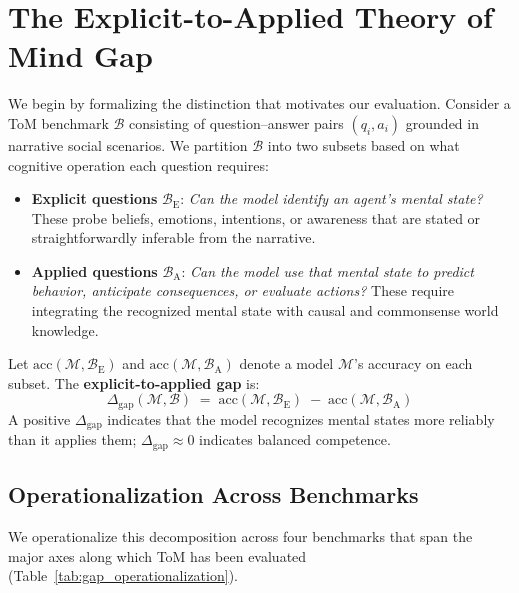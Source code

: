 \documentclass{article}
\begin{document}
\section{The Explicit-to-Applied Theory of Mind Gap}
\label{sec:gap}

We begin by formalizing the distinction that motivates our evaluation.
Consider a ToM benchmark $\mathcal{B}$ consisting of question--answer pairs $(q_i, a_i)$ grounded in narrative social scenarios.
We partition $\mathcal{B}$ into two subsets based on what cognitive operation each question requires:
%
\begin{itemize}[leftmargin=*,itemsep=1pt,topsep=3pt]
    \item \textbf{Explicit questions} $\mathcal{B}_\mathrm{E}$: \emph{Can the model identify an agent's mental state?}
    These probe beliefs, emotions, intentions, or awareness that are stated or straightforwardly inferable from the narrative.
    \item \textbf{Applied questions} $\mathcal{B}_\mathrm{A}$: \emph{Can the model use that mental state to predict behavior, anticipate consequences, or evaluate actions?}
    These require integrating the recognized mental state with causal and commonsense world knowledge.
\end{itemize}
%
Let $\mathrm{acc}(\mathcal{M}, \mathcal{B}_\mathrm{E})$ and $\mathrm{acc}(\mathcal{M}, \mathcal{B}_\mathrm{A})$ denote a model $\mathcal{M}$'s accuracy on each subset.
The \textbf{explicit-to-applied gap} is:
%
\begin{equation}
    \Delta_\mathrm{gap}(\mathcal{M}, \mathcal{B}) \;=\; \mathrm{acc}(\mathcal{M}, \mathcal{B}_\mathrm{E}) \;-\; \mathrm{acc}(\mathcal{M}, \mathcal{B}_\mathrm{A})
    \label{eq:gap}
\end{equation}
%
A positive $\Delta_\mathrm{gap}$ indicates that the model recognizes mental states more reliably than it applies them; $\Delta_\mathrm{gap} \approx 0$ indicates balanced competence.

\subsection{Operationalization Across Benchmarks}
\label{sec:gap_operationalization}

We operationalize this decomposition across four benchmarks that span the major axes along which ToM has been evaluated (Table~\ref{tab:gap_operationalization}).
\end{document}
